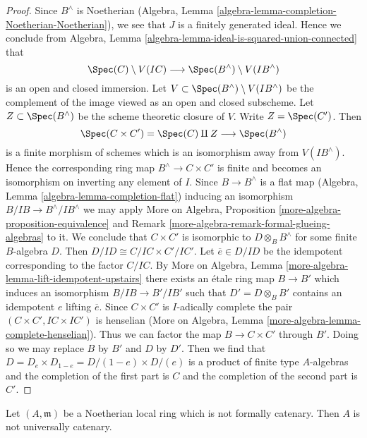 \begin{proof}
Since $B^\wedge$ is Noetherian (Algebra, Lemma
\ref{algebra-lemma-completion-Noetherian-Noetherian}),
we see that $J$ is a finitely generated
ideal. Hence we conclude from
Algebra, Lemma \ref{algebra-lemma-ideal-is-squared-union-connected}
that
$$
\Spec(C) \setminus V(IC) \longrightarrow \Spec(B^\wedge) \setminus V(IB^\wedge)
$$
is an open and closed immersion. Let
$V \subset \Spec(B^\wedge) \setminus V(IB^\wedge)$ be the complement
of the image viewed as an open and closed subscheme.
Let $Z \subset \Spec(B^\wedge)$ be the scheme
theoretic closure of $V$. Write $Z = \Spec(C')$. Then
$$
\Spec(C \times C') = \Spec(C) \amalg Z \longrightarrow \Spec(B^\wedge)
$$
is a finite morphism of schemes which is an isomorphism away from
$V(IB^\wedge)$. Hence the corresponding ring map $B^\wedge \to C \times C'$
is finite and becomes an isomorphism on inverting any element of $I$.
Since $B \to B^\wedge$ is a flat map
(Algebra, Lemma \ref{algebra-lemma-completion-flat}) inducing an isomorphism
$B/IB \to B^\wedge/IB^\wedge$ we may apply
More on Algebra, Proposition \ref{more-algebra-proposition-equivalence}
and Remark \ref{more-algebra-remark-formal-glueing-algebras} to it.
We conclude that $C \times C'$ is isomorphic to $D \otimes_B B^\wedge$
for some finite $B$-algebra $D$.
Then $D/ID \cong C/IC \times C'/IC'$. Let $\overline{e} \in D/ID$
be the idempotent corresponding to the factor $C/IC$.
By More on Algebra, Lemma
\ref{more-algebra-lemma-lift-idempotent-upstairs} there exists an
\'etale ring map $B \to B'$ which induces an isomorphism
$B/IB \to B'/IB'$ such that $D' = D \otimes_B B'$ contains an
idempotent $e$ lifting $\overline{e}$. Since $C \times C'$
is $I$-adically complete the pair $(C \times C', IC \times IC')$
is henselian
(More on Algebra, Lemma \ref{more-algebra-lemma-complete-henselian}).
Thus we can factor the map $B \to C \times C'$ through $B'$.
Doing so we may replace $B$ by $B'$ and $D$ by $D'$. Then
we find that $D = D_e \times D_{1 - e} = D/(1 - e) \times D/(e)$
is a product of finite type $A$-algebras and the completion of the
first part is $C$ and the completion of the second part is $C'$.
\end{proof}

\begin{lemma}
\label{lemma-not-formally-catenary}
Let $(A, \mathfrak m)$ be a Noetherian local ring which is not
formally catenary. Then $A$ is not universally catenary.
\end{lemma}


